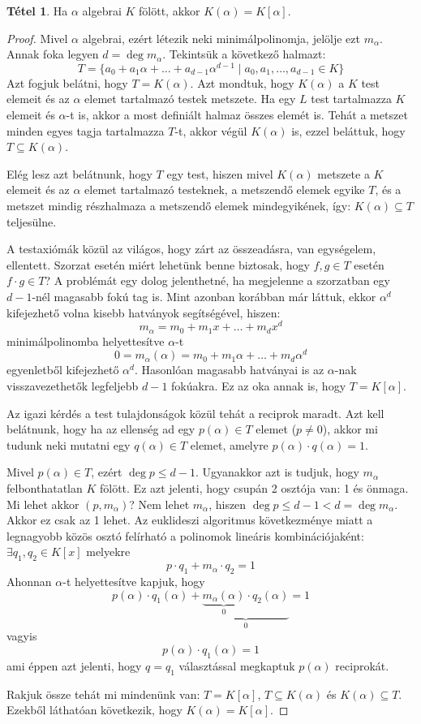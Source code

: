 \documentclass[12pt]{book}
\theoremstyle{plain} %
\theoremstyle{definition} %
\newtheorem{theo/}{Tétel}[section]
\newenvironment{theo}
  {\renewcommand{\qedsymbol}{$\clubsuit$}%
   \pushQED{\qed}\begin{theo/}}
  {\popQED\end{theo/}}
\theoremstyle{remark}
\renewcommand\qedsymbol{$\blacksquare$}
\numberwithin{equation}{section}  %
\begin{document}
	\begin{theo}
		Ha $\alpha$ algebrai $K$ fölött, akkor $K(\alpha)=K[\alpha]$.
	\end{theo}
	\begin{proof}
		Mivel $\alpha$ algebrai, ezért létezik neki minimálpolinomja, jelölje ezt $m_\alpha$. Annak foka legyen $d=\deg m_\alpha$. Tekintsük a következő halmazt:
		\[
			T = \{ a_0 + a_1\alpha + \ldots + a_{d-1} \alpha^{d-1} \mid a_0,a_1,\ldots,a_{d-1} \in K \}
		\]
		Azt fogjuk belátni, hogy $T=K(\alpha)$. Azt mondtuk, hogy $K(\alpha)$ a $K$ test elemeit és az $\alpha$ elemet tartalmazó testek metszete. Ha egy $L$ test tartalmazza $K$ elemeit és $\alpha$-t is, akkor a most definiált halmaz összes elemét is. Tehát a metszet minden egyes tagja tartalmazza $T$-t, akkor végül $K(\alpha)$ is, ezzel beláttuk, hogy $T\subseteq K(\alpha)$.
		
		Elég lesz azt belátnunk, hogy $T$ egy test, hiszen mivel $K(\alpha)$ metszete a $K$ elemeit és az $\alpha$ elemet tartalmazó testeknek, a metszendő elemek egyike $T$, és a metszet mindig részhalmaza a metszendő elemek mindegyikének, így: $K(\alpha) \subseteq T$ teljesülne.
		
		A testaxiómák közül az világos, hogy zárt az összeadásra, van egységelem, ellentett. Szorzat esetén miért lehetünk benne biztosak, hogy $f,g\in T$ esetén $f\cdot g\in T$? A problémát egy dolog jelenthetné, ha megjelenne a szorzatban egy $d-1$-nél magasabb fokú tag is. Mint azonban korábban már láttuk, ekkor $\alpha^d$ kifejezhető volna kisebb hatványok segítségével, hiszen:
		\[ m_\alpha = m_0 + m_1x+\ldots+m_dx^d  \]
		minimálpolinomba helyettesítve $\alpha$-t
		\[ 0 = m_\alpha(\alpha) = m_0 + m_1 \alpha + \ldots + m_d \alpha^d  \]
		egyenletből kifejezhető $\alpha^d$. Hasonlóan magasabb hatványai is az $\alpha$-nak visszavezethetők legfeljebb $d-1$ fokúakra. Ez az oka annak is, hogy $T=K[\alpha]$.
		
		Az igazi kérdés a test tulajdonságok közül tehát a reciprok maradt. Azt kell belátnunk, hogy ha az ellenség ad egy $p(\alpha)\in T$ elemet ($p\neq 0$), akkor mi tudunk neki mutatni egy $q(\alpha)\in T$ elemet, amelyre $p(\alpha)\cdot q(\alpha) = 1$.
		
		Mivel $p(\alpha)\in T$, ezért $\deg p \leq d-1$. Ugyanakkor azt is tudjuk, hogy $m_\alpha$ felbonthatatlan $K$ fölött. Ez azt jelenti, hogy csupán 2 osztója van: 1 és önmaga. Mi lehet akkor $(p,m_\alpha)$? Nem lehet $m_\alpha$, hiszen $\deg p\leq d-1 < d = \deg m_\alpha$. Akkor ez csak az 1 lehet. Az euklideszi algoritmus következménye miatt a legnagyobb közös osztó felírható a polinomok lineáris kombinációjaként: $\exists q_1, q_2 \in K[x]$ melyekre
		\[ p\cdot q_1 + m_\alpha \cdot q_2 = 1  \]
		Ahonnan $\alpha$-t helyettesítve kapjuk, hogy
		\[ p(\alpha) \cdot q_1(\alpha) + \underbrace{\underbrace{m_\alpha(\alpha)}_{0} \cdot q_2(\alpha)}_{0} = 1  \]
		vagyis
		\[ p(\alpha) \cdot q_1(\alpha) = 1  \]
		ami éppen azt jelenti, hogy $q=q_1$ választással megkaptuk $p(\alpha)$ reciprokát.
		
		Rakjuk össze tehát mi mindenünk van: $T=K[\alpha]$, $T\subseteq K(\alpha)$ és $K(\alpha)\subseteq T$. Ezekből láthatóan következik, hogy $K(\alpha) = K[\alpha]$.
	\end{proof}
\end{document}
